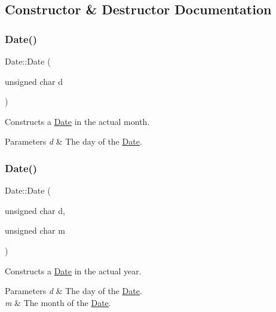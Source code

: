 \subsection{Constructor \& Destructor Documentation}
\mbox{\label{classDate_a4a6868a4db32c63f53aad84d794be0d3}} 
\subsubsection{\texorpdfstring{Date()}{Date()}\hspace{0.1cm}{\footnotesize\ttfamily [1/4]}}
{\footnotesize\ttfamily Date\+::\+Date (\begin{DoxyParamCaption}\item[{unsigned char}]{d }\end{DoxyParamCaption})\hspace{0.3cm}{\ttfamily [explicit]}}



Constructs a \hyperlink{classDate}{Date} in the actual month. 


\begin{DoxyParams}{Parameters}
{\em d} & The day of the \hyperlink{classDate}{Date}. \\
\hline
\end{DoxyParams}
\mbox{\label{classDate_a63d4a68d83a800750818af927c1d4bdd}} 
\subsubsection{\texorpdfstring{Date()}{Date()}\hspace{0.1cm}{\footnotesize\ttfamily [2/4]}}
{\footnotesize\ttfamily Date\+::\+Date (\begin{DoxyParamCaption}\item[{unsigned char}]{d,  }\item[{unsigned char}]{m }\end{DoxyParamCaption})}



Constructs a \hyperlink{classDate}{Date} in the actual year. 


\begin{DoxyParams}{Parameters}
{\em d} & The day of the \hyperlink{classDate}{Date}. \\
\hline
{\em m} & The month of the \hyperlink{classDate}{Date}. \\
\hline
\end{DoxyParams}
\mbox{\label{classDate_a08834516438a2776903c7e9246ae6a4e}} 
